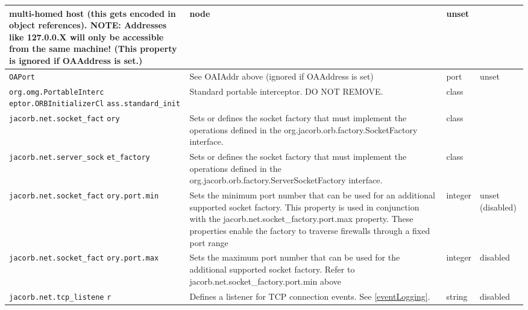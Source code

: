 {{\begin{small}
\begin{longtable}{|p{5cm}|p{7.5cm}|p{1.5cm}|p{1.5cm}|}
multi-homed host (this gets encoded in object references). NOTE:
Addresses like 127.0.0.X will only be accessible from the same
machine! (This property is ignored if OAAddress is set.) & node & unset \\
\hline
\verb"OAPort" & See OAIAddr above (ignored if OAAddress is set) & port & unset \\
\hline
\verb"org.omg.PortableInterc"
\verb"eptor.ORBInitializerCl"
\verb"ass.standard_init" & Standard portable interceptor. DO NOT
REMOVE. & class &  \\
\hline
\verb"jacorb.net.socket_fact"
\verb"ory" & Sets or defines the socket factory that must implement
the operations defined in the org.jacorb.orb.factory.SocketFactory
interface. & class & \\
\hline
\verb"jacorb.net.server_sock"
\verb"et_factory" & Sets or defines the socket factory that must
implement the operations defined in the
org.jacorb.orb.factory.ServerSocketFactory interface. & class & \\
\hline
\verb"jacorb.net.socket_fact"
\verb"ory.port.min" & Sets the minimum port number that can be used
for an additional supported socket factory. This property is used in
conjunction with the jacorb.net.socket\_factory.port.max
property. These properties enable the factory to traverse firewalls
through a fixed port range  & integer & unset (disabled) \\
\hline
\verb"jacorb.net.socket_fact"
\verb"ory.port.max" & Sets the maximum port number that can be used
for the additional supported socket factory. Refer to
jacorb.net.socket\_factory.port.min above & integer & disabled\\
\hline
\verb"jacorb.net.tcp_listene"
\verb"r" & Defines a listener for TCP connection events. See \ref{eventLogging}.
& string & disabled\\
\hline


\end{longtable}
\end{small}


}}
